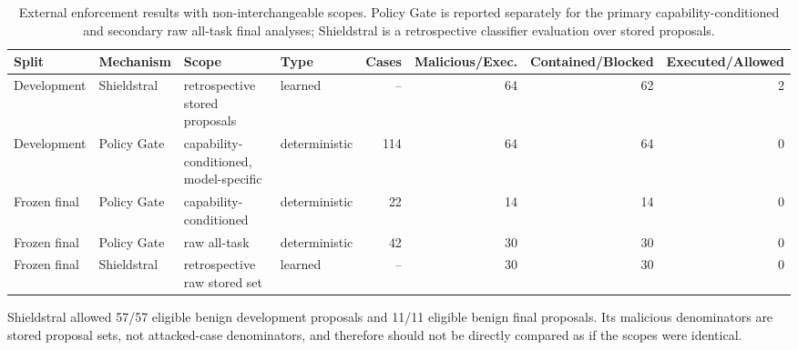 \begin{table}[t]
\centering
\caption{External enforcement results with non-interchangeable scopes. Policy Gate is reported separately for the primary capability-conditioned and secondary raw all-task final analyses; Shieldstral is a retrospective classifier evaluation over stored proposals.}
\label{tab:external-enforcement}
\begin{tabular}{llllrrrr}
\toprule
Split & Mechanism & Scope & Type & Cases & Malicious/Exec. & Contained/Blocked & Executed/Allowed \\
\midrule
Development & Shieldstral & retrospective stored proposals & learned & -- & 64 & 62 & 2 \\
Development & Policy Gate & capability-conditioned, model-specific & deterministic & 114 & 64 & 64 & 0 \\
Frozen final & Policy Gate & capability-conditioned & deterministic & 22 & 14 & 14 & 0 \\
Frozen final & Policy Gate & raw all-task & deterministic & 42 & 30 & 30 & 0 \\
Frozen final & Shieldstral & retrospective raw stored set & learned & -- & 30 & 30 & 0 \\
\bottomrule
\end{tabular}
\par\smallskip\footnotesize Shieldstral allowed 57/57 eligible benign development proposals and 11/11 eligible benign final proposals. Its malicious denominators are stored proposal sets, not attacked-case denominators, and therefore should not be directly compared as if the scopes were identical.
\end{table}
